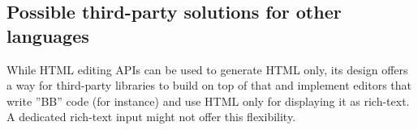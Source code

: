 \subsection{Possible third-party solutions for other languages}
\label{subsec:edit_api_adv_thir_party_lang}

While HTML editing APIs can be used to generate HTML only, its design offers a way for third-party libraries to build on top of that and implement editors that write ''BB'' code (for instance) and use HTML only for displaying it as rich-text. A dedicated rich-text input might not offer this flexibility.